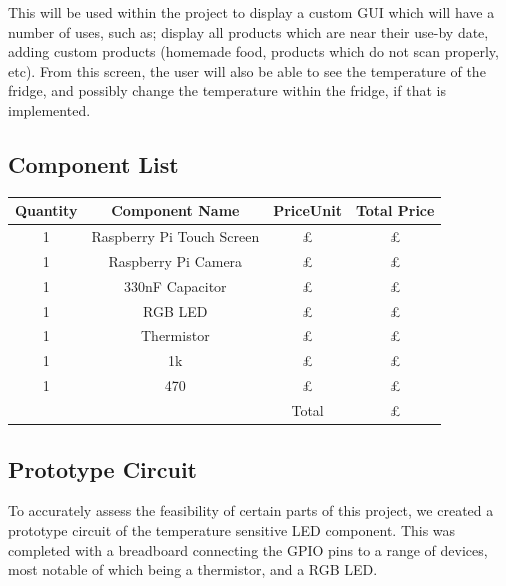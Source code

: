 \documentclass[10pt]{article}
\begin{document}
This will be used within the project to display a custom GUI which will have a number of uses, such as; display all products which are near their use-by date, adding custom products (homemade food, products which do not scan properly, etc). From this screen, the user will also be able to see the temperature of the fridge, and possibly change the temperature within the fridge, if that is implemented.

\subsection{Component List}
\begin{center}
	\begin{tabular}{ | c | c | c | c |}
		\hline
	 	Quantity & Component Name & PriceUnit & Total Price \\ \hline
		1	& Raspberry Pi Touch Screen 	& \pounds	& \pounds \\ \hline
		1 	& Raspberry Pi Camera 	& \pounds	& \pounds \\ \hline
		1	& 330nF Capacitor	& \pounds	& \pounds \\ \hline
		1	& RGB LED   & \pounds	& \pounds \\ \hline
		1	& Thermistor	& \pounds	& \pounds \\ \hline
		1	& 1k\ohm & \pounds	& \pounds \\ \hline
		1	& 470\ohm & \pounds	& \pounds \\ \hline
			& 	& Total 	& \pounds \\ \hline
	\end{tabular}
\end{center}

\newpage
\subsection{Prototype Circuit}
To accurately assess the feasibility of certain parts of this project, we created a prototype circuit of the temperature sensitive LED component. This was completed with a breadboard connecting the GPIO pins to a range of devices, most notable of which being a thermistor, and a RGB LED.
\end{document}
